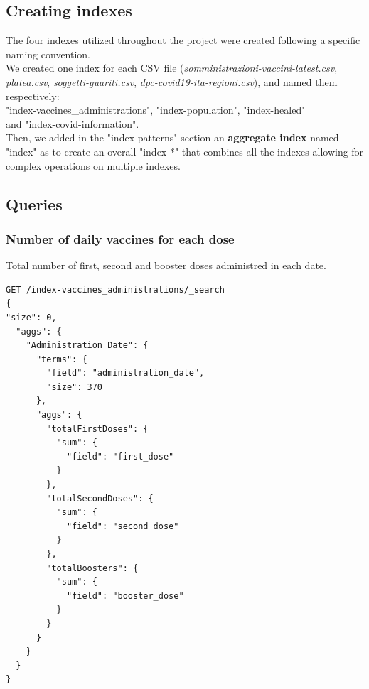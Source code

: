 \documentclass[12pt, a4paper]{article}
\begin{document}
\subsection{Creating indexes}
\label{sec:indexes}

The four indexes utilized throughout the project were created following a specific \\
naming convention. \\
We created one index for each CSV file (\emph{somministrazioni-vaccini-latest.csv}, 
\emph{platea.csv}, \emph{soggetti-guariti.csv}, \emph{dpc-covid19-ita-regioni.csv}),
and named them respectively: \\
"index-vaccines\_administrations", "index-population", 
"index-healed" \\ 
and "index-covid-information". \\
Then, we added in the "index-patterns" section an \textbf{aggregate index} named "index" 
as to create an overall "index-*" that combines all the indexes allowing for complex
operations on multiple indexes.

\subsection{Queries}

\subsubsection{Number of daily vaccines for each dose}
Total number of first, second and booster doses administred in each date.
\begin{tcolorbox}[fontupper=\scriptsize]
  \begin{verbatim}
GET /index-vaccines_administrations/_search
{
"size": 0, 
  "aggs": {
    "Administration Date": {
      "terms": {
        "field": "administration_date",
        "size": 370
      },
      "aggs": {
        "totalFirstDoses": {
          "sum": {
            "field": "first_dose"
          }
        },        
        "totalSecondDoses": {
          "sum": {
            "field": "second_dose"
          }
        },        
        "totalBoosters": {
          "sum": {
            "field": "booster_dose"
          }
        }
      }
    }
  } 
}
  \end{verbatim}
\end{tcolorbox}
\end{document}
